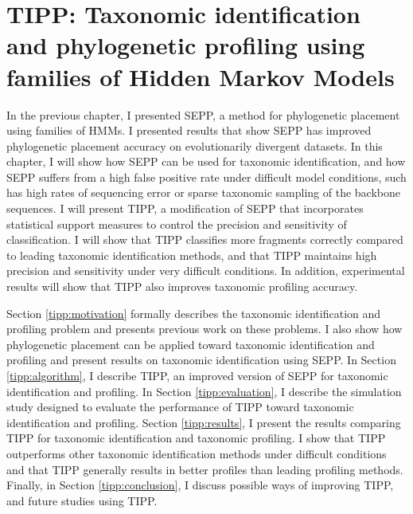 \chapter{TIPP: Taxonomic identification and phylogenetic profiling using families of Hidden Markov Models}\label{tipp_chapter}
%

In the previous chapter, I presented SEPP, a method for phylogenetic placement using families of HMMs.  I presented results that show SEPP has improved phylogenetic placement accuracy on evolutionarily divergent datasets.  In this chapter, I will show how SEPP can be used for taxonomic identification, and how SEPP suffers from a high false positive rate under difficult model conditions, such has high rates of sequencing error or sparse taxonomic sampling of the backbone sequences.  I will present TIPP, a modification of SEPP that incorporates statistical support measures to control the precision and sensitivity of classification.  I will show that TIPP classifies more fragments correctly compared to leading taxonomic identification methods, and that TIPP maintains high precision and sensitivity under very difficult conditions.  In addition, experimental results will show that TIPP also improves taxonomic profiling accuracy.  

Section \ref{tipp:motivation} formally describes the taxonomic identification and profiling problem and presents previous work on these problems.  I also show how phylogenetic placement can be applied toward taxonomic identification and profiling and present results on taxonomic identification using SEPP.  In Section \ref{tipp:algorithm}, I describe TIPP, an improved version of SEPP for taxonomic identification and profiling.  In Section \ref{tipp:evaluation}, I describe the simulation study designed to evaluate the performance of TIPP toward taxonomic identification and profiling.  Section \ref{tipp:results}, I present the results comparing TIPP for taxonomic identification and taxonomic profiling.  I show that TIPP outperforms other taxonomic identification methods under difficult conditions and that TIPP generally results in better profiles than leading profiling methods.  Finally, in Section \ref{tipp:conclusion}, I discuss possible ways of improving TIPP, and future studies using TIPP.

